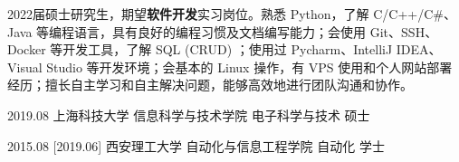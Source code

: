 \documentclass[zh]{resume}
\begin{document}
\makeheader

{\onehalfspacing\hspace{2em}%
    2022届硕士研究生，期望\textbf{软件开发}实习岗位。熟悉 Python，了解 C/C++/C\#、Java 等编程语言，具有良好的编程习惯及文档编写能力；会使用 Git、SSH、Docker 等开发工具，了解 SQL (CRUD) ；使用过 Pycharm、IntelliJ IDEA、Visual Studio 等开发环境；会基本的 Linux 操作，有 VPS 使用和个人网站部署经历；擅长自主学习和自主解决问题，能够高效地进行团队沟通和协作。
    \par}

\begin{educations}
    \education%
    {2019.08}%
    {上海科技大学}%
    {信息科学与技术学院}%
    {电子科学与技术}%
    {硕士}

    \separator{0.5ex}
    \education%
    {2015.08}%
    [2019.06]%
    {西安理工大学}%
    {自动化与信息工程学院}%
    {自动化}%
    {学士}
\end{educations}

\begin{competences}

\end{competences}
\end{document}

